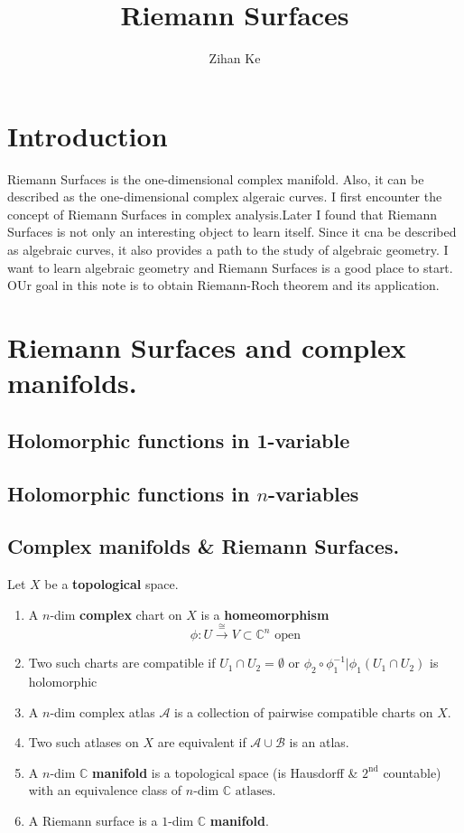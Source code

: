 \documentclass{article}
\title{Riemann Surfaces}
\author{Zihan Ke}
\begin{document}
\maketitle
\section*{Introduction}
Riemann Surfaces is the one-dimensional complex manifold. Also, it can be described as the one-dimensional complex algeraic curves. I first encounter the concept of Riemann Surfaces in complex analysis.Later I found that Riemann Surfaces is not only an interesting object to learn itself. Since it cna be described as algebraic curves, it also provides a path to the study of algebraic geometry. I want to learn algebraic geometry and Riemann Surfaces is a good place to start. 
OUr goal in this note is to obtain Riemann-Roch theorem and its application.
\newpage
\tableofcontents 
\newpage

\section{Riemann Surfaces and complex \textbf{manifolds}.}
\subsection{Holomorphic functions in 1-variable}
\subsection{Holomorphic functions in $n$-variables}
\subsection{Complex manifolds \& Riemann Surfaces.}

\begin{definition}
    Let $X$ be a \textbf{topological} space.
    \begin{enumerate}
        \item A $n$-dim \textbf{complex} chart on $X$ is a \textbf{homeomorphism}
        \[
        \phi : U \xrightarrow{\cong} V \subset \mathbb{C}^n \text{ open}
        \]
        \item Two such charts are compatible if
        $U_1 \cap U_2 = \emptyset$ or $\phi_2 \circ \phi_1^{-1} \big| \phi_1 (U_1 \cap U_2)$ is holomorphic
        \item A $n$-dim complex atlas $\mathcal{A}$ is a collection of pairwise compatible charts on $X$.
        \item Two such atlases on $X$ are equivalent if $\mathcal{A} \cup \mathcal{B}$ is an atlas.
        \item A $n$-dim $\mathbb{C}$ \textbf{manifold} is a topological space (is Hausdorff \& $2^{\text{nd}}$ countable) with an equivalence class of $n$-dim $\mathbb{C} \text{ atlases}$.
        \item A Riemann surface is a $1$-dim $\mathbb{C}$ \textbf{manifold}.
    \end{enumerate}
\end{definition}
\end{document}
